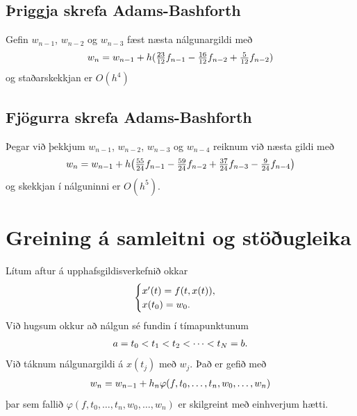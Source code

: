 \documentclass[letterpaper,10pt,icelandic]{sphinxmanual}
\begin{document}
\subsection{Þriggja skrefa Adams-Bashforth}
\label{kafli06:riggja-skrefa-adams-bashforth}
Gefin \(w_{n-1}\), \(w_{n-2}\) og \(w_{n-3}\) fæst næsta
nálgunargildi með
\begin{gather}
\begin{split}w_{n} = w_{n-1} + {h}(\tfrac{23}{12} f_{n-1} - \tfrac {16}{12}
  f_{n-2} + \tfrac 5{12} f_{n-2})\end{split}\notag
\end{gather}
og staðarskekkjan er \(O(h^4)\)


\subsection{Fjögurra skrefa Adams-Bashforth}
\label{kafli06:fjogurra-skrefa-adams-bashforth}
Þegar við þekkjum \(w_{n-1}\), \(w_{n-2}\), \(w_{n-3}\) og
\(w_{n-4}\) reiknum við næsta gildi með
\begin{gather}
\begin{split}w_{n} = w_{n-1} + h\big(\tfrac{55}{24}f_{n-1} - \tfrac{59}{24}f_{n-2} +
\tfrac {37}{24}f_{n-3} -\tfrac 9{24}f_{n-4}\big)\end{split}\notag
\end{gather}
og skekkjan í nálguninni er \(O(h^5)\).


\section{Greining á samleitni og stöðugleika}
\label{kafli06:greining-a-samleitni-og-stougleika}
Lítum aftur á upphafsgildisverkefnið okkar
\begin{gather}
\begin{split}\begin{cases}
  x'(t)=f(t,x(t)),\\
x(t_0)=w_0.
\end{cases}\end{split}\notag
\end{gather}
Við hugsum okkur að nálgun sé fundin í tímapunktunum
\begin{gather}
\begin{split}a=t_0<t_1<t_2<\cdots<t_N=b.\end{split}\notag
\end{gather}
Við táknum nálgunargildi á \(x(t_j)\) með \(w_j\). Það er gefið
með
\begin{gather}
\begin{split}w_n=w_{n-1}+h_n\varphi(f,t_{0},\dots,t_n,w_{0},\dots,w_{n})\end{split}\notag
\end{gather}
þar sem fallið \(\varphi(f,t_{0},\dots,t_n,w_{0},\dots,w_{n})\) er
skilgreint með einhverjum hætti.
\end{document}
